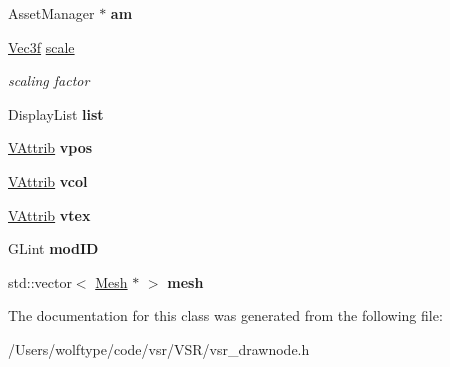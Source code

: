 \begin{DoxyCompactItemize}
\item 
\hypertarget{classvsr_1_1_mesh_node_abf1f6757a654adc6e8fea2465e520173}{Asset\-Manager $\ast$ {\bfseries am}}\label{classvsr_1_1_mesh_node_abf1f6757a654adc6e8fea2465e520173}

\item 
\hypertarget{classvsr_1_1_mesh_node_a859a23f4f27a34bb4d5cd96f255e6f9e}{\hyperlink{classvsr_1_1_vec3}{Vec3f} \hyperlink{classvsr_1_1_mesh_node_a859a23f4f27a34bb4d5cd96f255e6f9e}{scale}}\label{classvsr_1_1_mesh_node_a859a23f4f27a34bb4d5cd96f255e6f9e}

\begin{DoxyCompactList}\small\item\em scaling factor \end{DoxyCompactList}\item 
\hypertarget{classvsr_1_1_mesh_node_a67327466371f3dbcfdf8b1afd966a032}{Display\-List {\bfseries list}}\label{classvsr_1_1_mesh_node_a67327466371f3dbcfdf8b1afd966a032}

\item 
\hypertarget{classvsr_1_1_mesh_node_a77cf8c43fc57703ba6a4acd0502477b1}{\hyperlink{classvsr_1_1_v_attrib}{V\-Attrib} {\bfseries vpos}}\label{classvsr_1_1_mesh_node_a77cf8c43fc57703ba6a4acd0502477b1}

\item 
\hypertarget{classvsr_1_1_mesh_node_a60d2749a225b6020a175a036209aec5f}{\hyperlink{classvsr_1_1_v_attrib}{V\-Attrib} {\bfseries vcol}}\label{classvsr_1_1_mesh_node_a60d2749a225b6020a175a036209aec5f}

\item 
\hypertarget{classvsr_1_1_mesh_node_ae4361cdb2b576b328adeaf5a60a8c956}{\hyperlink{classvsr_1_1_v_attrib}{V\-Attrib} {\bfseries vtex}}\label{classvsr_1_1_mesh_node_ae4361cdb2b576b328adeaf5a60a8c956}

\item 
\hypertarget{classvsr_1_1_mesh_node_a5c234a8cdb2ea34c6173e0970b8ece55}{G\-Lint {\bfseries mod\-I\-D}}\label{classvsr_1_1_mesh_node_a5c234a8cdb2ea34c6173e0970b8ece55}

\item 
\hypertarget{classvsr_1_1_mesh_node_a7b7cc5ec23a2bfa5cfcbadf54ac22223}{std\-::vector$<$ \hyperlink{structvsr_1_1_mesh}{Mesh} $\ast$ $>$ {\bfseries mesh}}\label{classvsr_1_1_mesh_node_a7b7cc5ec23a2bfa5cfcbadf54ac22223}

\end{DoxyCompactItemize}


The documentation for this class was generated from the following file\-:\begin{DoxyCompactItemize}
\item 
/\-Users/wolftype/code/vsr/\-V\-S\-R/vsr\-\_\-drawnode.\-h\end{DoxyCompactItemize}

